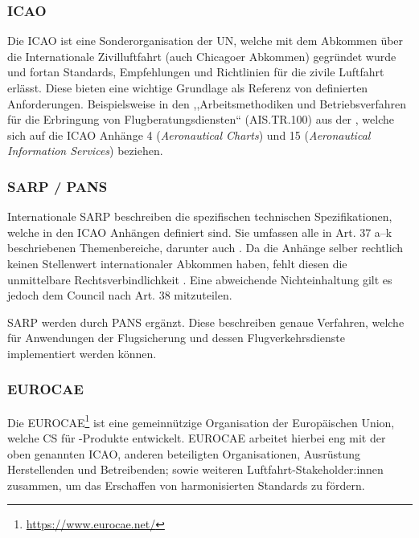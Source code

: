 \subsubsection{ICAO}

    Die \acf{ICAO} ist eine Sonderorganisation der \acf{UN}, welche mit dem Abkommen über die Internationale Zivilluftfahrt (auch Chicagoer Abkommen) gegründet wurde und fortan Standards, Empfehlungen und Richtlinien für die zivile Luftfahrt erlässt. 
    Diese bieten eine wichtige Grundlage als Referenz von definierten Anforderungen. 
    Beispielsweise in den ,,Arbeitsmethodiken und Betriebsverfahren für die Erbringung von Flugberatungsdiensten`` (\textsf{AIS.TR.100}) aus der , welche sich auf die \ac{ICAO} Anhänge 4 (\textit{Aeronautical Charts}) und 15 (\textit{Aeronautical Information Services}) beziehen.
    \cite[Anh. IV]{2017R0373}
    
\subsubsection{SARP / PANS}

    Internationale \acf{SARP} beschreiben die spezifischen technischen Spezifikationen, welche in den \ac{ICAO} Anhängen definiert sind.
    Sie umfassen alle in Art. 37 a--k beschriebenen Themenbereiche, darunter auch \atmans{} 
    \cite[S. 43f.]{icao_convention}.
    Da die Anhänge selber rechtlich keinen Stellenwert internationaler Abkommen haben, fehlt diesen die unmittelbare Rechtsverbindlichkeit 
    \cite[156--159]{eu_icao_milde}.
    Eine abweichende Nichteinhaltung gilt es jedoch dem Council nach Art. 38 mitzuteilen. \cite[S. 45f]{icao_convention}

    \medskip
    \ac{SARP} werden durch \ac{PANS} ergänzt. 
    Diese beschreiben genaue Verfahren, welche für Anwendungen der Flugsicherung und dessen Flugverkehrsdienste implementiert werden können. 

\subsubsection{EUROCAE}

    Die \acf{EUROCAE}\footnote{\href{https://www.eurocae.net/}{https://www.eurocae.net/}} ist eine gemeinnützige Organisation der Europäischen Union, welche \acf{CS} für \atmans-Produkte entwickelt. 
    \ac{EUROCAE} arbeitet hierbei eng mit der oben genannten \ac{ICAO}, anderen beteiligten Organisationen, Ausrüstung Herstellenden und Betreibenden; sowie weiteren Luft\-fahrt-Stakeholder:innen zusammen, um das Erschaffen von harmonisierten Standards zu fördern.

